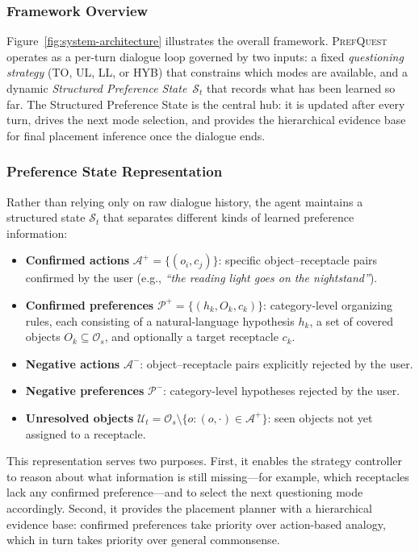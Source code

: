 \documentclass[manuscript,review,anonymous]{acmart}
\begin{document}
{\subsubsection{Framework Overview}

Figure~\ref{fig:system-architecture} illustrates the overall framework. \textsc{PrefQuest} operates as a per-turn dialogue loop governed by two inputs: a fixed \textit{questioning strategy} (TO, UL, LL, or HYB) that constrains which modes are available, and a dynamic \textit{Structured Preference State}~$\mathcal{S}_t$ that records what has been learned so far. The Structured Preference State is the central hub: it is updated after every turn, drives the next mode selection, and provides the hierarchical evidence base for final placement inference once the dialogue ends.

\subsubsection{Preference State Representation}
\label{sec:structured-state}

Rather than relying only on raw dialogue history, the agent maintains a structured state $\mathcal{S}_t$ that separates different kinds of learned preference information:

\begin{itemize}[leftmargin=*]
    \item \textbf{Confirmed actions} $\mathcal{A}^+ = \{(o_i, c_j)\}$: specific object--receptacle pairs confirmed by the user (e.g., \textit{``the reading light goes on the nightstand''}).
    \item \textbf{Confirmed preferences} $\mathcal{P}^+ = \{(h_k, O_k, c_k)\}$: category-level organizing rules, each consisting of a natural-language hypothesis $h_k$, a set of covered objects $O_k \subseteq \mathcal{O}_s$, and optionally a target receptacle $c_k$.
    \item \textbf{Negative actions} $\mathcal{A}^-$: object--receptacle pairs explicitly rejected by the user.
    \item \textbf{Negative preferences} $\mathcal{P}^-$: category-level hypotheses rejected by the user.
    \item \textbf{Unresolved objects} $\mathcal{U}_t = \mathcal{O}_s \setminus \{o : (o, \cdot) \in \mathcal{A}^+\}$: seen objects not yet assigned to a receptacle.
\end{itemize}

This representation serves two purposes. First, it enables the strategy controller to reason about what information is still missing---for example, which receptacles lack any confirmed preference---and to select the next questioning mode accordingly. Second, it provides the placement planner with a hierarchical evidence base: confirmed preferences take priority over action-based analogy, which in turn takes priority over general commonsense.

}
\end{document}
